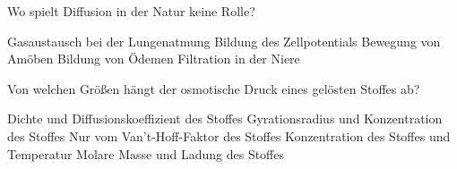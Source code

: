 \documentclass[11pt]{exam}
\begin{document}
\begin{questions}
\vspace{3mm}\question Wo spielt Diffusion in der Natur keine Rolle?

\begin{choices}
	\choice Gasaustausch bei der Lungenatmung
	\choice Bildung des Zellpotentials
	\choice Bewegung von Amöben
	\choice Bildung von Ödemen
	\choice Filtration in der Niere
\end{choices}

\vspace{3mm}\question Von welchen Größen hängt der osmotische Druck eines gelösten Stoffes ab?

\begin{choices}
	\choice Dichte und Diffusionskoeffizient des Stoffes
	\choice Gyrationsradius und Konzentration des Stoffes
	\choice Nur vom Van't-Hoff-Faktor des Stoffes
	\choice Konzentration des Stoffes und Temperatur
	\choice Molare Masse und Ladung des Stoffes
\end{choices}

\vspace{3mm}\end{questions}
\end{document}

